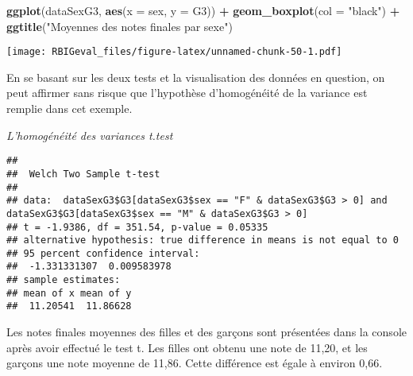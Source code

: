 \documentclass[
]{article}
\newenvironment{Shaded}{\begin{snugshade}}{\end{snugshade}}
\newcommand{\DataTypeTok}[1]{\textcolor[rgb]{0.13,0.29,0.53}{#1}}
\newcommand{\DecValTok}[1]{\textcolor[rgb]{0.00,0.00,0.81}{#1}}
\newcommand{\KeywordTok}[1]{\textcolor[rgb]{0.13,0.29,0.53}{\textbf{#1}}}
\newcommand{\NormalTok}[1]{#1}
\newcommand{\OperatorTok}[1]{\textcolor[rgb]{0.81,0.36,0.00}{\textbf{#1}}}
\newcommand{\StringTok}[1]{\textcolor[rgb]{0.31,0.60,0.02}{#1}}
\begin{document}
\begin{Shaded}
\begin{Highlighting}[]
\KeywordTok{ggplot}\NormalTok{(dataSexG3, }\KeywordTok{aes}\NormalTok{(}\DataTypeTok{x =}\NormalTok{ sex, }\DataTypeTok{y =}\NormalTok{ G3)) }\OperatorTok{+}
\StringTok{        }\KeywordTok{geom_boxplot}\NormalTok{(}\DataTypeTok{col =} \StringTok{"black"}\NormalTok{) }\OperatorTok{+}
\StringTok{        }\KeywordTok{ggtitle}\NormalTok{(}\StringTok{"Moyennes des notes finales par sexe"}\NormalTok{)}
\end{Highlighting}
\end{Shaded}

\texttt{[image: RBIGeval\_files/figure-latex/unnamed-chunk-50-1.pdf]}

En se basant sur les deux tests et la visualisation des données en
question, on peut affirmer sans risque que l'hypothèse d'homogénéité de
la variance est remplie dans cet exemple.

\emph{L'homogénéité des variances t.test}

\begin{Shaded}
\end{Shaded}

\begin{verbatim}
## 
##  Welch Two Sample t-test
## 
## data:  dataSexG3$G3[dataSexG3$sex == "F" & dataSexG3$G3 > 0] and dataSexG3$G3[dataSexG3$sex == "M" & dataSexG3$G3 > 0]
## t = -1.9386, df = 351.54, p-value = 0.05335
## alternative hypothesis: true difference in means is not equal to 0
## 95 percent confidence interval:
##  -1.331331307  0.009583978
## sample estimates:
## mean of x mean of y 
##  11.20541  11.86628
\end{verbatim}

Les notes finales moyennes des filles et des garçons sont présentées
dans la console après avoir effectué le test t. Les filles ont obtenu
une note de 11,20, et les garçons une note moyenne de 11,86. Cette
différence est égale à environ 0,66.
\end{document}
